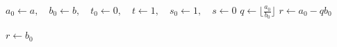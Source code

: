 \vspace{1em}
\begin{algorithm}[H]
    \SetAlgoVlined
    \SetAlgoLined
    \caption{Algoritmo Euclideo Esteso($a,b$)}
    \label{alg:euclideo_esteso}

    $a_0 \gets a, \quad b_0 \gets b, \quad t_0 \gets 0, \quad t \gets 1, \quad s_0 \gets 1, \quad s \gets 0$\;
    $q \gets \lfloor \frac{a_0}{b_0}\rfloor$\;
    $r \gets a_0 - qb_0$\;
    
    $r \gets b_0$\;
    \;
\end{algorithm}
\vspace{2em}

